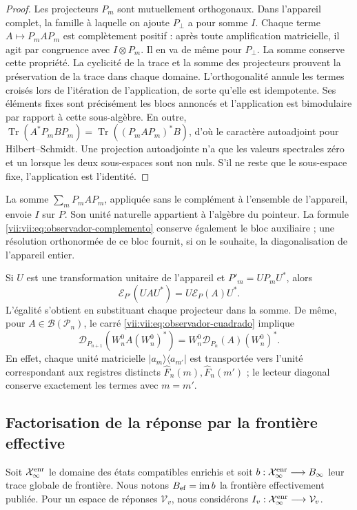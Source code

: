 \begin{proof}
Les projecteurs \(P_m\) sont mutuellement orthogonaux. Dans l'appareil complet, la famille à laquelle on ajoute \(P_\perp\) a pour somme \(I\). Chaque terme \(A\mapsto P_mAP_m\) est complètement positif : après toute amplification matricielle, il agit par congruence avec \(I\otimes P_m\). Il en va de même pour \(P_\perp\). La somme conserve cette propriété. La cyclicité de la trace et la somme des projecteurs prouvent la préservation de la trace dans chaque domaine. L'orthogonalité annule les termes croisés lors de l'itération de l'application, de sorte qu'elle est idempotente. Ses éléments fixes sont précisément les blocs annoncés et l'application est bimodulaire par rapport à cette sous-algèbre. En outre, \(\operatorname{Tr}(A^*P_mBP_m)
 =\operatorname{Tr}((P_mAP_m)^*B)\), d'où le caractère autoadjoint pour Hilbert--Schmidt. Une projection autoadjointe n'a que les valeurs spectrales zéro et un lorsque les deux sous-espaces sont non nuls. S'il ne reste que le sous-espace fixe, l'application est l'identité.
\end{proof}

La somme \(\sum_mP_mAP_m\), appliquée sans le complément à l'ensemble de
l'appareil, envoie \(I\) sur \(P\). Son unité naturelle appartient à l'algèbre
du pointeur. La formule \eqref{vii:vii:eq:observador-complemento} conserve
également le bloc auxiliaire ; une résolution orthonormée de ce bloc
fournit, si on le souhaite, la diagonalisation de l'appareil entier.

Si \(U\) est une transformation unitaire de l'appareil et
\(P'_m=UP_mU^*\), alors
\[
 \mathcal E_{P'}(UAU^*)=U\mathcal E_P(A)U^*.
\]
L'égalité s'obtient en substituant chaque projecteur dans la somme.
De même, pour \(A\in\mathcal B(\mathcal P_n)\), le carré
\eqref{vii:vii:eq:observador-cuadrado} implique
\[
 \mathcal D_{P_{n+1}}(W_n^0A(W_n^0)^*)
 =W_n^0\mathcal D_{P_n}(A)(W_n^0)^*.
\]
En effet, chaque unité matricielle \(|a_m\rangle\langle a_{m'}|\)
est transportée vers l'unité correspondant aux registres distincts
\(\widehat F_n(m),\widehat F_n(m')\) ; le lecteur diagonal conserve
exactement les termes avec \(m=m'\).

\subsection{Factorisation de la réponse par la frontière effective}
\label{vii:vii:sec:observador-factorizacion}

Soit \(\mathcal X_\infty^{\rm enr}\) le domaine des états compatibles
enrichis et soit
\(b:\mathcal X_\infty^{\rm enr}\longrightarrow B_\infty\) leur trace
globale de frontière. Nous notons \(B_{\rm ef}=\operatorname{im}b\)
la frontière effectivement publiée. Pour un espace de réponses
\(\mathcal V_v\), nous considérons
\(I_v:\mathcal X_\infty^{\rm enr}\longrightarrow\mathcal V_v\).

